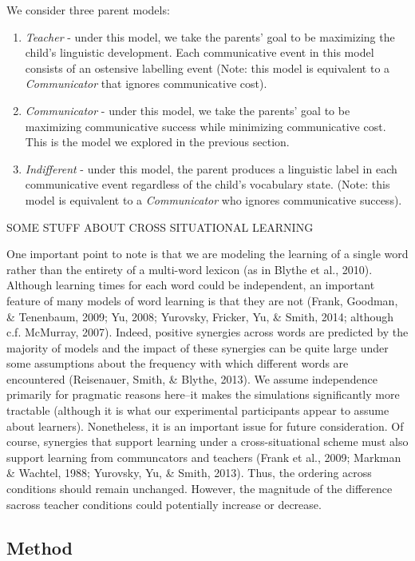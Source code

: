 \documentclass[english,,man,floatsintext]{apa6}
\begin{document}
We consider three parent models:

\begin{enumerate}
\def\labelenumi{\arabic{enumi}.}
\item
  \emph{Teacher} - under this model, we take the parents' goal to be maximizing the child's linguistic development. Each communicative event in this model consists of an ostensive labelling event (Note: this model is equivalent to a \emph{Communicator} that ignores communicative cost).
\item
  \emph{Communicator} - under this model, we take the parents' goal to be maximizing communicative success while minimizing communicative cost. This is the model we explored in the previous section.
\item
  \emph{Indifferent} - under this model, the parent produces a linguistic label in each communicative event regardless of the child's vocabulary state. (Note: this model is equivalent to a \emph{Communicator} who ignores communicative success).
\end{enumerate}

SOME STUFF ABOUT CROSS SITUATIONAL LEARNING

One important point to note is that we are modeling the learning of a single word rather than the entirety of a multi-word lexicon (as in Blythe et al., 2010). Although learning times for each word could be independent, an important feature of many models of word learning is that they are not (Frank, Goodman, \& Tenenbaum, 2009; Yu, 2008; Yurovsky, Fricker, Yu, \& Smith, 2014; although c.f. McMurray, 2007). Indeed, positive synergies across words are predicted by the majority of models and the impact of these synergies can be quite large under some assumptions about the frequency with which different words are encountered (Reisenauer, Smith, \& Blythe, 2013). We assume independence primarily for pragmatic reasons here--it makes the simulations significantly more tractable (although it is what our experimental participants appear to assume about learners). Nonetheless, it is an important issue for future consideration. Of course, synergies that support learning under a cross-situational scheme must also support learning from communcators and teachers (Frank et al., 2009; Markman \& Wachtel, 1988; Yurovsky, Yu, \& Smith, 2013). Thus, the ordering across conditions should remain unchanged. However, the magnitude of the difference sacross teacher conditions could potentially increase or decrease.

\hypertarget{method-2}{%
\subsection{Method}\label{method-2}}
\end{document}
